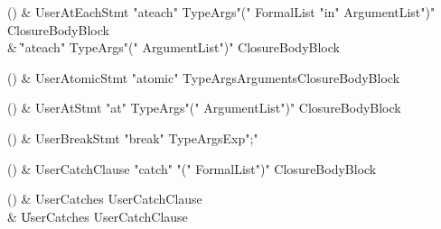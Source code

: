 \begin{bbgrammarappendix}{4.0in}

() & UserAtEachStmt \label{prod:UserAtEachStmt}  \:
 \xcd"ateach" TypeArgs\opt \xcd"(" FormalList \xcd"in" ArgumentList\opt \xcd")" ClosureBodyBlock \\
 &    \| \xcd"ateach" TypeArgs\opt \xcd"(" ArgumentList\opt \xcd")" ClosureBodyBlock

\end{bbgrammarappendix}

\begin{bbgrammarappendix}{3.8in}

() & UserAtomicStmt \label{prod:UserAtomicStmt}  \:
 \xcd"atomic" TypeArgs\opt Arguments\opt ClosureBodyBlock

\end{bbgrammarappendix}

\begin{bbgrammarappendix}{3.8in}

() & UserAtStmt \label{prod:UserAtStmt}  \:
 \xcd"at" TypeArgs\opt \xcd"(" ArgumentList\opt \xcd")" ClosureBodyBlock

\end{bbgrammarappendix}

\begin{bbgrammarappendix}{3.8in}

() & UserBreakStmt \label{prod:UserBreakStmt}  \:
 \xcd"break" TypeArgs\opt Exp\opt \xcd";"

\end{bbgrammarappendix}

\begin{bbgrammarappendix}{3.8in}

() & UserCatchClause \label{prod:UserCatchClause}  \:
 \xcd"catch" \xcd"(" FormalList\opt \xcd")" ClosureBodyBlock

\end{bbgrammarappendix}

\begin{bbgrammarappendix}{3.8in}

() & UserCatches \label{prod:UserCatches}  \:
         UserCatchClause  \\
 &    \| UserCatches UserCatchClause

\end{bbgrammarappendix}

